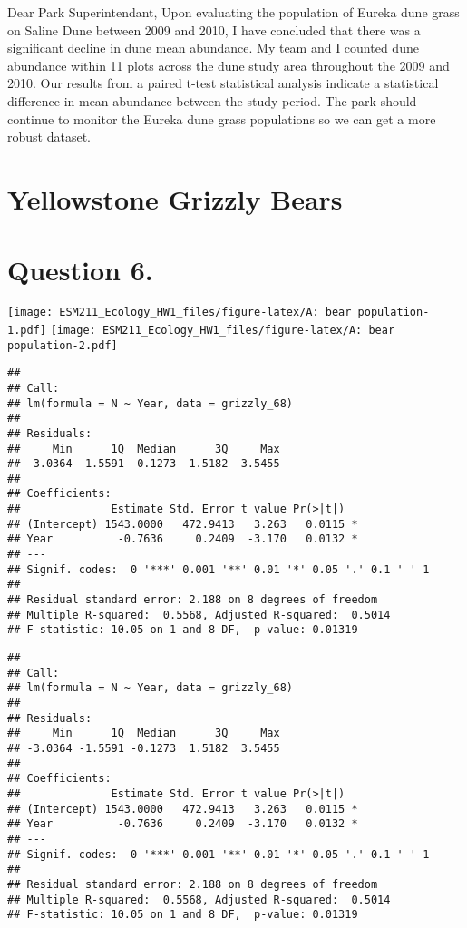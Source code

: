 \documentclass[]{article}
\begin{document}
Dear Park Superintendant, \parindent  Upon evaluating the population of
Eureka dune grass on Saline Dune between 2009 and 2010, I have concluded
that there was a significant decline in dune mean abundance. My team and
I counted dune abundance within 11 plots across the dune study area
throughout the 2009 and 2010. Our results from a paired t-test
statistical analysis indicate a statistical difference in mean abundance
between the study period. The park should continue to monitor the Eureka
dune grass populations so we can get a more robust dataset.

\hypertarget{yellowstone-grizzly-bears}{%
\section{Yellowstone Grizzly Bears}\label{yellowstone-grizzly-bears}}

\hypertarget{question-6.}{%
\section{Question 6.}\label{question-6.}}

\texttt{[image: ESM211\_Ecology\_HW1\_files/figure-latex/A: bear population-1.pdf]}
\texttt{[image: ESM211\_Ecology\_HW1\_files/figure-latex/A: bear population-2.pdf]}

\begin{verbatim}
## 
## Call:
## lm(formula = N ~ Year, data = grizzly_68)
## 
## Residuals:
##     Min      1Q  Median      3Q     Max 
## -3.0364 -1.5591 -0.1273  1.5182  3.5455 
## 
## Coefficients:
##              Estimate Std. Error t value Pr(>|t|)  
## (Intercept) 1543.0000   472.9413   3.263   0.0115 *
## Year          -0.7636     0.2409  -3.170   0.0132 *
## ---
## Signif. codes:  0 '***' 0.001 '**' 0.01 '*' 0.05 '.' 0.1 ' ' 1
## 
## Residual standard error: 2.188 on 8 degrees of freedom
## Multiple R-squared:  0.5568, Adjusted R-squared:  0.5014 
## F-statistic: 10.05 on 1 and 8 DF,  p-value: 0.01319
\end{verbatim}

\begin{verbatim}
## 
## Call:
## lm(formula = N ~ Year, data = grizzly_68)
## 
## Residuals:
##     Min      1Q  Median      3Q     Max 
## -3.0364 -1.5591 -0.1273  1.5182  3.5455 
## 
## Coefficients:
##              Estimate Std. Error t value Pr(>|t|)  
## (Intercept) 1543.0000   472.9413   3.263   0.0115 *
## Year          -0.7636     0.2409  -3.170   0.0132 *
## ---
## Signif. codes:  0 '***' 0.001 '**' 0.01 '*' 0.05 '.' 0.1 ' ' 1
## 
## Residual standard error: 2.188 on 8 degrees of freedom
## Multiple R-squared:  0.5568, Adjusted R-squared:  0.5014 
## F-statistic: 10.05 on 1 and 8 DF,  p-value: 0.01319
\end{verbatim}
\end{document}

